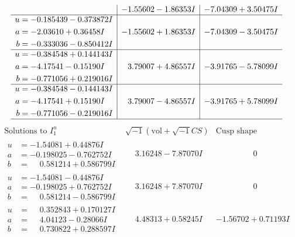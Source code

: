 \documentclass[1p]{elsarticle_modified}
\theoremstyle{definition}
\newcommand{\I}{\sqrt{-1}}
\begin{document}
$$\begin{array}{c|c|c}
 & -1.55602 - 1.86353 I & -7.04309 + 3.50475 I \\ \hline\begin{aligned}
u &= -0.185439 - 0.373872 I \\
a &= -2.03610 + 0.36458 I \\
b &= -0.333036 - 0.850412 I\end{aligned}
 & -1.55602 + 1.86353 I & -7.04309 - 3.50475 I \\ \hline\begin{aligned}
u &= -0.384548 + 0.144143 I \\
a &= -4.17541 - 0.15190 I \\
b &= -0.771056 + 0.219016 I\end{aligned}
 & \phantom{-}3.79007 + 4.86557 I & -3.91765 - 5.78099 I \\ \hline\begin{aligned}
u &= -0.384548 - 0.144143 I \\
a &= -4.17541 + 0.15190 I \\
b &= -0.771056 - 0.219016 I\end{aligned}
 & \phantom{-}3.79007 - 4.86557 I & -3.91765 + 5.78099 I\\
 \hline 
 \end{array}$$\newpage$$\begin{array}{c|c|c}  
\text{Solutions to }I^u_{1}& \I (\text{vol} + \sqrt{-1}CS) & \text{Cusp shape}\\
 \hline 
\begin{aligned}
u &= -1.54081 + 0.44876 I \\
a &= -0.198025 - 0.762752 I \\
b &= \phantom{-}0.581214 + 0.586799 I\end{aligned}
 & \phantom{-}3.16248 - 7.87070 I & \phantom{-0.000000 } 0 \\ \hline\begin{aligned}
u &= -1.54081 - 0.44876 I \\
a &= -0.198025 + 0.762752 I \\
b &= \phantom{-}0.581214 - 0.586799 I\end{aligned}
 & \phantom{-}3.16248 + 7.87070 I & \phantom{-0.000000 } 0 \\ \hline\begin{aligned}
u &= \phantom{-}0.352843 + 0.170127 I \\
a &= \phantom{-}4.04123 - 0.28066 I \\
b &= \phantom{-}0.730822 + 0.288597 I\end{aligned}
 & \phantom{-}4.48313 + 0.58245 I & -1.56702 + 0.71193 I \\ \hline\begin{aligned}

\end{aligned}
\end{array}$$
\end{document}
